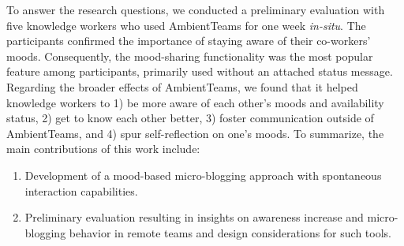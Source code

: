 


\bigskip\noindent To answer the research questions, we conducted a preliminary evaluation with five knowledge workers who used AmbientTeams for one week \textit{in-situ}. The participants confirmed the importance of staying aware of their co-workers' moods. Consequently, the mood-sharing functionality was the most popular feature among participants, primarily used without an attached status message. Regarding the broader effects of AmbientTeams, we found that it helped knowledge workers to 1) be more aware of each other's moods and availability status, 2) get to know each other better, 3) foster communication outside of AmbientTeams, and 4) spur self-reflection on one's moods. To summarize, the main contributions of this work include:

\begin{enumerate}
    \item Development of a mood-based micro-blogging approach with spontaneous interaction capabilities.
    \item Preliminary evaluation resulting in insights on awareness increase and micro-blogging behavior in remote teams and design considerations for such tools.
\end{enumerate}

